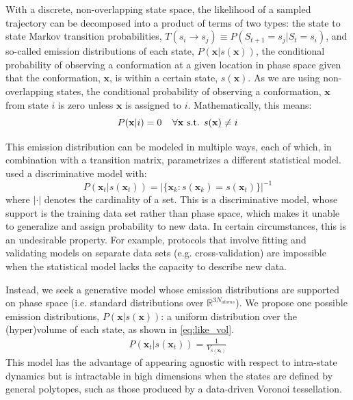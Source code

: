 \documentclass[journal=jpcbfk, layout=traditional, manuscript=article]{achemso}
\begin{document}
With a discrete, non-overlapping state space, the likelihood of a sampled trajectory can be decomposed into a product of terms of two types: the state to state Markov transition probabilities, $T(s_i \rightarrow s_j) \equiv P(S_{t+1}=s_j | S_{t}=s_i)$, and so-called emission distributions of each state, $P(\mathbf{x} | s(\mathbf{x}))$, the conditional probability of observing a conformation at a given location in phase space given that the conformation, $\mathbf{x}$, is within a certain state, $s(\mathbf{x})$. As we are using  non-overlapping states, the conditional probability of observing a conformation, $\mathbf{x}$ from state $i$ is zero unless $\mathbf{x}$ is assigned to $i$. Mathematically, this means:
$$ P(\mathbf{x} | i) = 0 \;\;\;\; \forall \mathbf{x} \textnormal{ s.t. } s(\mathbf{x}) \neq i$$

This emission distribution can be modeled in multiple ways, each of which, in combination with a transition matrix, parametrizes a different statistical model. \citet{Kellogg2012Evaluation} used a discriminative model with:
\begin{equation}
P(\mathbf{x}_t | s(\mathbf{x}_t)) = \big| \{ \mathbf{x}_k : s(\mathbf{x}_k) = s(\mathbf{x}_t) \} \big|^{-1}
\end{equation} where $| \cdot |$ denotes the cardinality of a set. This is a discriminative model, whose support is the training data set rather than phase space, which makes it unable to generalize and assign probability to new data. In certain circumstances, this is an undesirable property. For example, protocols that involve fitting and validating models on separate data sets (e.g. cross-validation) are impossible when the statistical model lacks the capacity to describe new data.

Instead, we seek a generative model whose emission distributions are supported on phase space (i.e. standard distributions over $\mathbb{R}^{3N_{atoms}}$). We propose one possible emission distributions, $P(\mathbf{x} | s(\mathbf{x}))$: a uniform distribution over the (hyper)volume of each state, as shown in \cref{eq:like_vol}. 
\begin{equation}
\label{eq:like_vol}
\begin{split}
 P(\mathbf{x}_t | s(\mathbf{x}_t)) = \frac{1}{V_{s(\mathbf{x}_{t})}}
\end{split}
\end{equation} 
This model has the advantage of appearing agnostic with respect to intra-state dynamics but is intractable in high dimensions when the states are defined by general polytopes, such as those produced by a data-driven Voronoi tessellation. 
\end{document}

